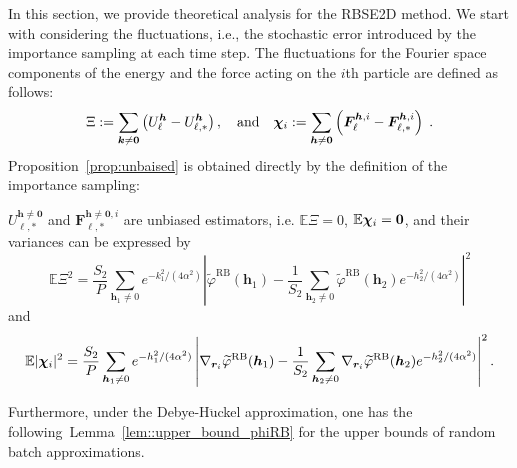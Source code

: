 In this section, we provide theoretical analysis for the RBSE2D method. We start with considering the fluctuations, i.e., the stochastic error introduced by the importance sampling at each time step.
The fluctuations for the Fourier space components of the energy and the force acting on the $i$th particle are defined as follows:
\begin{equation}\label{eq::xichi}
	\Xi := \sum_{\bm{k}\neq\bm{0}}\left( U_{\ell}^{\bm{h}}-U_{\ell,*}^{\bm{h}}\right),\quad\text{and}\quad\boldsymbol{\chi}_{i} :=\sum_{\bm{h}\neq\bm{0}}\left(\bm{F}_{\ell}^{\bm{h},i}-\bm{F}_{\ell,*}^{\bm{h},i}\right)\;.
\end{equation}
Proposition~\ref{prop:unbaised} is obtained directly by the definition of the importance sampling:
\begin{prop}\label{prop:unbaised}
	$U_{\ell,*}^{\bm{h}\neq\bm{0}}$ and $\bm{F}_{\ell,*}^{\bm{h}\neq\bm{0},i}$ are unbiased estimators, i.e. $\mathbb{E}\Xi= 0$, $\mathbb{E} \boldsymbol{\chi}_{i} = \bm 0$, and their variances can be expressed by
	\begin{equation}\label{eq::Exi}
		\mathbb{E}\Xi^2=\frac{S_2}{P}\sum_{\bm{h}_1\neq 0}e^{-k_1^2/(4\alpha^2)}\left|\widetilde{\varphi}^{\text{RB}}(\bm{h}_1)-\frac{1}{S_2} \sum_{\bm{h}_2\neq 0}\widetilde{\varphi}^{\text{RB}}(\bm{h}_2)e^{-h_2^2/(4\alpha^2)}\right|^2
	\end{equation}
	and
	\begin{equation}\label{eq::Echi}
		\mathbb{E}|\boldsymbol{\chi}_{i}|^2=\frac{S_2}{P}\sum_{\bm{h}_1\neq 0}e^{-h_1^2/(4\alpha^2)}\left|\nabla_{\bm{r}_i}\widetilde{\varphi}^{\text{RB}}(\bm{h}_1)-\frac{1}{S_2} \sum_{\bm{h}_2\neq 0}\nabla_{\bm{r}_i}\widetilde{\varphi}^{\text{RB}}(\bm{h}_2)e^{-h_2^2/(4\alpha^2)}\right|^2.
	\end{equation}
\end{prop}

Furthermore, under the Debye-H$\ddot{\text{u}}$ckel approximation, one has the following~Lemma~\ref{lem::upper_bound_phiRB} for the upper bounds of random batch approximations.

